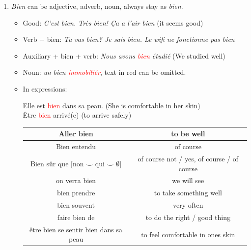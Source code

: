 \documentclass{book}
\begin{document}
\begin{enumerate}
            \item \textit{Bien} can be adjective, adverb, noun, always stay as \textit{bien}.
                \begin{itemize}
                    \item Good: \textit{C'est bien. Très bien! Ça a l'air bien} (it seems good)
                    \item Verb + bien: \textit{Tu vas bien? Je sais bien. Le wifi ne fonctionne pas bien}
                    \item Auxiliary + bien + verb: \textit{Nous avons \textcolor{red}{bien} étudié} (We studied well)
                    \item Noun: \textit{un bien \textcolor{red}{immobiliér}}, text in red can be omitted.
                    \item In expressions:
                        \begin{center}
                            Elle est \textcolor{red}{bien} dans sa peau. (She is comfortable in her skin) \\
                            Être \textcolor{red}{bien} arrivé(e) (to arrive safely) \\
                            \vspace{0.2cm}
                            \begin{tabular}{|c|c|}
                                \hline
                                Aller bien & to be well \\
                                \hline
                                Bien entendu & of course \\
                                \hline
                                Bien sûr que [non $\smile$ qui $\smile$ $\emptyset$] & of course not / yes, of course / of course \\
                                \hline
                                on verra bien & we will see \\
                                \hline
                                bien prendre & to take something well \\
                                \hline
                                bien souvent & very often \\
                                \hline
                                faire bien de & to do the right / good thing \\
                                \hline
                                être bien se sentir bien dans sa peau & to feel comfortable in ones skin \\
                                \hline
                            \end{tabular}
                        \end{center}
                \end{itemize}
            

\end{enumerate}
\end{document}

